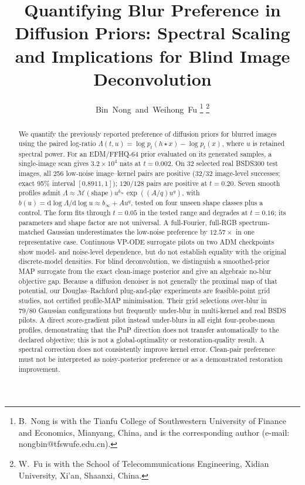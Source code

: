 \documentclass[10pt,journal]{IEEEtran}
\newcommand{\blur}{\star}
\newcommand{\Lam}{\Lambda}
\begin{document}
\title{Quantifying Blur Preference in Diffusion Priors: Spectral Scaling and Implications
for Blind Image Deconvolution}

\author{Bin~Nong~and~Weihong~Fu%
\thanks{B.~Nong is with the Tianfu College of Southwestern University of Finance
and Economics, Mianyang, China, and is the corresponding author
(e-mail: nongbin@tfswufe.edu.cn).}%
\thanks{W.~Fu is with the School of Telecommunications Engineering, Xidian University,
Xi'an, Shaanxi, China.}}


\maketitle

\begin{abstract}
We quantify the previously reported preference of diffusion priors for blurred images using the
paired log-ratio $\Lam(t,u)=\log p_t(h\blur x)-\log p_t(x)$, where $u$ is retained spectral
power. For an EDM/FFHQ-64 prior evaluated on its generated samples, a single-image scan gives
$3.2\times10^4$ nats at $t=0.002$. On 32 selected real BSDS300 test images, all 256 low-noise
image--kernel pairs are positive ($32/32$ image-level successes; exact 95\% interval
$[0.8911,1]$); $120/128$ pairs are positive at $t=0.20$. Seven smooth profiles admit
$\Lam\approx\mathcal M(\mathrm{shape})u^{b_\infty}\exp((A/q)u^q)$, with
$b(u)=\mathrm d\log\Lam/\mathrm d\log u\approx b_\infty+Au^q$, tested on four unseen shape
classes plus a control. The form fits through $t=0.05$ in the tested range and degrades at
$t=0.16$; its parameters and shape factor are not universal. A full-Fourier, full-RGB
spectrum-matched Gaussian underestimates the low-noise preference by $12.57\times$ in one
representative case. Continuous VP-ODE surrogate pilots on two ADM checkpoints show model- and
noise-level dependence, but do not establish equality with the original discrete-model densities.
For blind deconvolution, we distinguish a smoothed-prior MAP surrogate from the exact clean-image
posterior and give an algebraic no-blur objective gap. Because a diffusion denoiser is not
generally the proximal map of that potential, our Douglas--Rachford plug-and-play experiments
are feasible-point grid studies, not certified profile-MAP minimisation. Their grid selections
over-blur in $79/80$ Gaussian configurations but frequently under-blur in multi-kernel and real
BSDS pilots. A direct score-gradient pilot instead under-blurs in all eight four-probe-mean
profiles, demonstrating that the PnP direction does not transfer automatically to the declared
objective; this is not a global-optimality or restoration-quality result. A spectral correction
does not consistently improve kernel error. Clean-pair preference must not be interpreted as
noisy-posterior preference or as a demonstrated restoration improvement.
\end{abstract}
\end{document}

